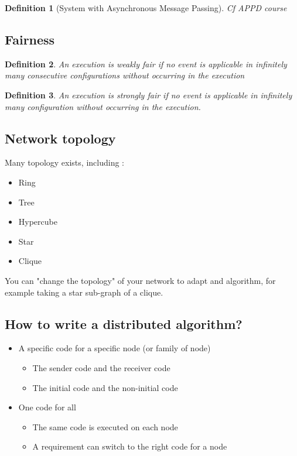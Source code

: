 \documentclass{article}
\newtheorem{defi}{Definition}
\begin{document}
\begin{defi}[System with Asynchronous Message Passing]
Cf APPD course
\end{defi}


\subsection{Fairness}
\begin{defi}
An execution is \emph{weakly fair} if no event is applicable in infinitely many consecutive configurations without occurring in the execution
\end{defi}


\begin{defi}
An execution is \emph{strongly fair} if no event is applicable in infinitely many configuration without occurring in the execution.
\end{defi}


\subsection{Network topology}
Many topology exists, including :
\begin{itemize}[noitemsep]
\item Ring
\item Tree
\item Hypercube
\item Star
\item Clique
\end{itemize}

You can "change the topology" of your network to adapt and algorithm, for example taking a star sub-graph of a clique.


\subsection{How to write a distributed algorithm?}
\begin{itemize}[noitemsep]
\item A specific code for a specific node (or family of node)
\begin{itemize}[noitemsep]
\item The sender code and the receiver code
\item The initial code and the non-initial code
\end{itemize}
\item One code for all
\begin{itemize}[noitemsep]
\item The same code is executed on each node
\item A requirement can switch to the right code for a node
\end{itemize}
\end{itemize}
\end{document}
